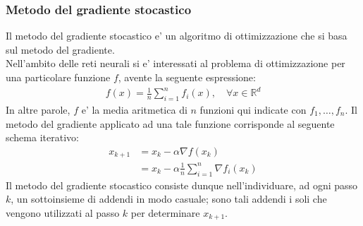 \documentclass[a4paper,12pt]{article}
\begin{document}
\subsubsection{Metodo del gradiente stocastico}
Il metodo del gradiente stocastico e' un algoritmo di ottimizzazione che si basa sul metodo del gradiente.\\
Nell’ambito delle reti neurali si e' interessati al problema di ottimizzazione per una particolare funzione $f$, avente la seguente espressione:
\begin{align*}
  f(x) = \frac{1}{n} \sum_{i=1}^{n} f_i(x), \quad \forall x \in \mathbb{R}^d
\end{align*}
In altre parole, $f$ e' la media aritmetica di $n$ funzioni qui indicate con $f_1, \ldots, f_n$. Il metodo del gradiente applicato ad una tale funzione corrisponde al seguente schema iterativo:
\begin{align}
  x_{k+1} & = x_k - \alpha \nabla f(x_k) \\
  & = x_k - \alpha \frac{1}{n} \sum_{i=1}^{n} \nabla f_i(x_k)
\end{align}
Il metodo del gradiente stocastico consiste dunque nell’individuare, ad ogni passo $k$, un sottoinsieme di addendi in modo casuale; sono tali addendi i soli che vengono utilizzati al passo $k$ per determinare $x_{k+1}$.\\
\vspace{1px}\\
\end{document}
